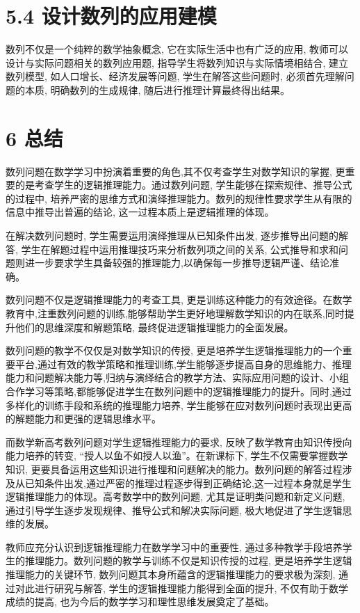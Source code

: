 \documentclass[10pt]{article}
\begin{document}
\section*{5.4 设计数列的应用建模}

数列不仅是一个纯粹的数学抽象概念, 它在实际生活中也有广泛的应用, 教师可以设计与实际问题相关的数列应用题, 指导学生将数列知识与实际情境相结合, 建立数列模型, 如人口增长、经济发展等问题, 学生在解答这些问题时, 必须首先理解问题的本质, 明确数列的生成规律, 随后进行推理计算最终得出结果。

\section*{6 总结}

数列问题在数学学习中扮演着重要的角色,其不仅考查学生对数学知识的掌握, 更重要的是考查学生的逻辑推理能力。通过数列问题, 学生能够在探索规律、推导公式的过程中, 培养严密的思维方式和演绎推理能力。数列的规律性要求学生从有限的信息中推导出普遍的结论, 这一过程本质上是逻辑推理的体现。

在解决数列问题时, 学生需要运用演绎推理从已知条件出发, 逐步推导出问题的解答, 学生在解题过程中运用推理技巧来分析数列项之间的关系, 公式推导和求和问题则进一步要求学生具备较强的推理能力,以确保每一步推导逻辑严谨、结论准确。

数列问题不仅是逻辑推理能力的考查工具, 更是训练这种能力的有效途径。在数学教育中,注重数列问题的训练,能够帮助学生更好地理解数学知识的内在联系,同时提升他们的思维深度和解题策略, 最终促进逻辑推理能力的全面发展。

数列问题的教学不仅仅是对数学知识的传授, 更是培养学生逻辑推理能力的一个重要平台,通过有效的教学策略和推理训练,学生能够逐步提高自身的思维能力、推理能力和问题解决能力等,归纳与演绎结合的教学方法、实际应用问题的设计、小组合作学习等策略,都能够促进学生在数列问题中的逻辑推理能力的提升。同时,通过多样化的训练手段和系统的推理能力培养, 学生能够在应对数列问题时表现出更高的解题能力和更强的逻辑思维水平。

而数学新高考数列问题对学生逻辑推理能力的要求, 反映了数学教育由知识传授向能力培养的转变, “授人以鱼不如授人以渔”。在新课标下, 学生不仅需要掌握数学知识, 更要具备运用这些知识进行推理和问题解决的能力。数列问题的解答过程涉及从已知条件出发,通过严密的推理过程逐步得到正确结论,这一过程本身就是学生逻辑推理能力的体现。高考数学中的数列问题, 尤其是证明类问题和新定义问题, 通过引导学生逐步发现规律、推导公式和解决实际问题, 极大地促进了学生逻辑思维的发展。

教师应充分认识到逻辑推理能力在数学学习中的重要性, 通过多种教学手段培养学生的推理能力。数列问题的教学与训练不仅是知识传授的过程, 更是培养学生逻辑推理能力的关键环节, 数列问题其本身所蕴含的逻辑推理能力的要求极为深刻, 通过对此进行研究与解答, 学生的逻辑推理能力能得到全面的提升, 不仅有助于数学成绩的提高, 也为今后的数学学习和理性思维发展奠定了基础。
\end{document}
